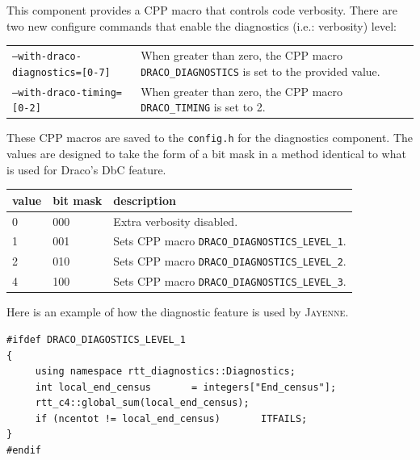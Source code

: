\documentclass[note]{ResearchNote}
\newcommand{\draco}{Draco}
\newcommand{\tableText}[1]{{\raggedright #1}}
\begin{document}
This component provides a CPP macro that controls code verbosity.
There are two new configure commands that enable the diagnostics
(i.e.: verbosity) level:
%
\begin{center}
  \footnotesize
  \begin{tabular}{lp{4.0in}}
    \hline\hline

    \texttt{--with-draco-diagnostics=[0-7]} & \tableText{When greater
      than zero, the CPP macro \texttt{DRACO\_DIAGNOSTICS} is set to
      the provided value.} \\

    \texttt{--with-draco-timing=[0-2]} & \tableText{When greater than
      zero, the CPP macro \texttt{DRACO\_TIMING} is set to 2.} \\
 
    \hline\hline 
  \end{tabular}
\end{center}
%
These CPP macros are saved to the \texttt{config.h} for the
\textsf{diagnostics} component.  The values are designed to take the
form of a bit mask in a method identical to what is used for \draco's
DbC feature.
%
\begin{center}
  \footnotesize
  \begin{tabular}{llp{4.0in}}
    \hline\hline
    \textbf{value} & \textbf{bit mask} & \textbf{description} \\
    \hline
    0 & 000 & \tableText{Extra verbosity disabled.} \\
    1 & 001 & \tableText{Sets CPP macro \texttt{DRACO\_DIAGNOSTICS\_LEVEL\_1}.} \\
    2 & 010 & \tableText{Sets CPP macro \texttt{DRACO\_DIAGNOSTICS\_LEVEL\_2}.} \\
    4 & 100 & \tableText{Sets CPP macro \texttt{DRACO\_DIAGNOSTICS\_LEVEL\_3}.} \\

    \hline\hline 
  \end{tabular}
\end{center}

Here is an example of how the \textsf{diagnostic} feature is used by
\textsc{Jayenne}.

\begin{lstlisting}[xleftmargin=0.50in, xrightmargin=0.50in]
#ifdef DRACO_DIAGOSTICS_LEVEL_1
{
     using namespace rtt_diagnostics::Diagnostics;
     int local_end_census       = integers["End_census"];
     rtt_c4::global_sum(local_end_census);
     if (ncentot != local_end_census)       ITFAILS;
}
#endif
\end{lstlisting}
\end{document}
